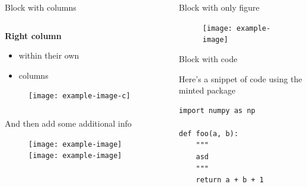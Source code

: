\documentclass[aspectratio=1610]{beamer}
\begin{document}
\begin{frame}[fragile]{}
\begin{columns}[t]
\begin{column}{.5\linewidth}
\begin{haiblock}{Block with columns}
\begin{columns}[t]
\begin{column}{0.5\linewidth}
                    \textbf{Right column}
                    \begin{itemize}
                        \item within their own
                        \item columns
                    \end{itemize}

                    \begin{figure}[b]
                        \centering
                        \texttt{[image: example-image-c]}%
                    \end{figure}

                \end{column}
            \end{columns}

            \vspace{1em}

            And then add some additional info
            \begin{figure}
                \centering
                \texttt{[image: example-image]}%
                \hfill%
                \texttt{[image: example-image]}%
            \end{figure}
                
            \end{haiblock}
            
        \end{column}
        \begin{column}{.5\linewidth}
        
            \begin{haiblock}{Block with only figure}

            \begin{figure}
                \centering
                \texttt{[image: example-image]}
            \end{figure}
            \end{haiblock}
            
            \begin{haiblock}{Block with code}

                Here's a snippet of code using the minted package

                \begin{verbatim}
import numpy as np

def foo(a, b):
    """
    asd
    """
    return a + b + 1
                \end{verbatim}


\end{haiblock}
\end{column}
\end{columns}
\end{frame}
\end{document}
